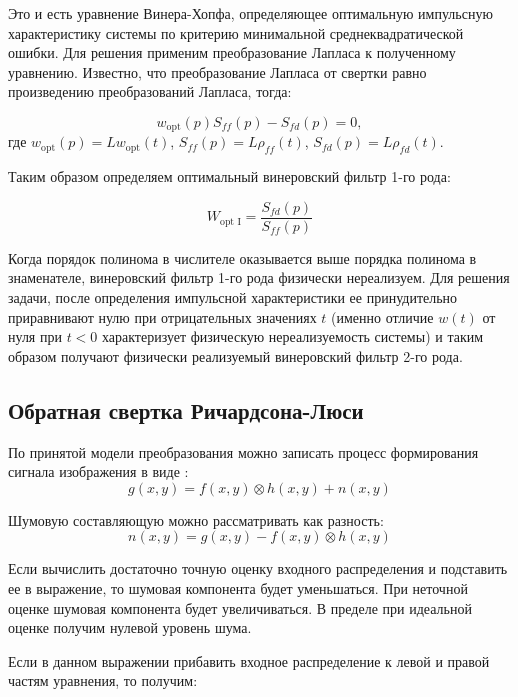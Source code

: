 Это и есть уравнение Винера-Хопфа, определяющее оптимальную импульсную характеристику системы по критерию минимальной среднеквадратической ошибки. Для решения применим преобразование Лапласа к полученному уравнению. Известно, что преобразование Лапласа от свертки равно произведению преобразований Лапласа, тогда:

\begin{equation}
	w_\text{opt}(p)S_{ff}(p)-S_{fd}(p)=0,
\end{equation}
где $w_\text{opt}(p)=L{w_\text{opt}(t)}$, $S_{ff}(p)=L{\rho_{ff}(t)}$, $S_{fd}(p)=L{\rho_{fd}(t)}$.

Таким образом определяем оптимальный винеровский фильтр 1-го рода:

\begin{equation}
	W_\text{opt I}= \frac{S_{fd}(p)}{S_{ff}(p)}
\end{equation}

Когда порядок полинома в числителе оказывается выше порядка полинома в знаменателе, винеровский фильтр 1-го рода физически нереализуем. Для решения задачи, после определения импульсной характеристики ее принудительно приравнивают нулю при отрицательных значениях  $t$ (именно отличие $w(t)$ от нуля при  $t<0$ характеризует физическую нереализуемость системы) и таким образом получают физически реализуемый винеровский фильтр 2-го рода.

\subsection{Обратная свертка Ричардсона-Люси}

По принятой модели преобразования можно записать процесс формирования сигнала изображения в виде \cite{rld}:
\begin{equation}
	g(x,y)=f(x,y)\otimes h(x,y)+n(x,y)
\end{equation}

Шумовую составляющую можно рассматривать как разность:
\begin{equation}
	n(x,y) = g(x,y) - f(x,y)\otimes h(x,y)
\end{equation}

Если вычислить достаточно точную оценку входного распределения и подставить ее в выражение, то шумовая компонента будет уменьшаться. При неточной оценке шумовая компонента будет увеличиваться. В пределе при идеальной оценке получим нулевой уровень шума.

Если в данном выражении прибавить входное распределение к левой и правой частям уравнения, то получим:


